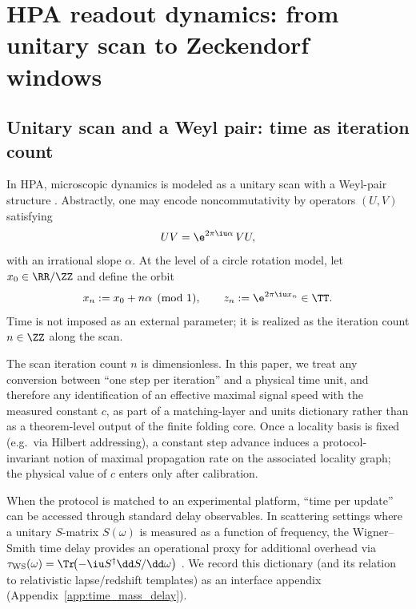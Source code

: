 
\section{HPA readout dynamics: from unitary scan to Zeckendorf windows}
\label{sec:hpa_readout}

\subsection{Unitary scan and a Weyl pair: time as iteration count}
\label{subsec:weyl_scan}

In HPA, microscopic dynamics is modeled as a unitary scan with a Weyl-pair structure \cite{Weyl1931}.
Abstractly, one may encode noncommutativity by operators $(U,V)$ satisfying
\begin{equation}\label{eq:weyl_pair}
UV=\e^{2\pi\iu\alpha}\,VU,
\end{equation}
with an irrational slope $\alpha$.
At the level of a circle rotation model, let $x_0\in\RR/\ZZ$ and define the orbit
\begin{equation}\label{eq:kronecker_orbit}
x_n:=x_0+n\alpha \pmod{1},\qquad
z_n:=\e^{2\pi\iu x_n}\in\TT.
\end{equation}
Time is not imposed as an external parameter; it is realized as the iteration count $n\in\ZZ$ along the scan.

\begin{remark}\label{rem:scan_rate_c_dictionary}
The scan iteration count $n$ is dimensionless.
In this paper, we treat any conversion between ``one step per iteration'' and a physical time unit, and therefore any identification of an effective maximal signal speed with the measured constant $c$, as part of a matching-layer and units dictionary rather than as a theorem-level output of the finite folding core.
Once a locality basis is fixed (e.g.\ via Hilbert addressing), a constant step advance induces a protocol-invariant notion of maximal propagation rate on the associated locality graph; the physical value of $c$ enters only after calibration.
\end{remark}

\begin{remark}\label{rem:delay_time_dictionary}
When the protocol is matched to an experimental platform, ``time per update'' can be accessed through standard delay observables.
In scattering settings where a unitary $S$-matrix $S(\omega)$ is measured as a function of frequency, the Wigner--Smith time delay provides an operational proxy for additional overhead via $\tau_{\mathrm{WS}}(\omega)=\Tr\!\bigl(-\iu S^\dagger \dd S/\dd\omega\bigr)$ \cite{Wigner1955,Smith1960}.
We record this dictionary (and its relation to relativistic lapse/redshift templates) as an interface appendix (Appendix~\ref{app:time_mass_delay}).
\end{remark}

